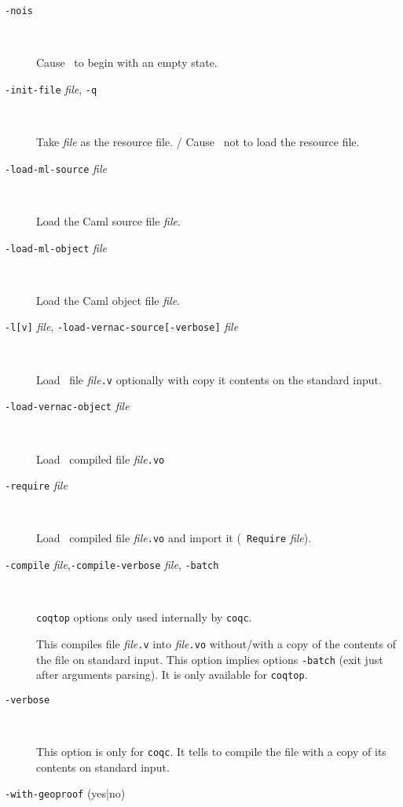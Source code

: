 \begin{description}
\item[{\tt -nois}]\ 

  Cause \Coq~to begin with an empty state.

\item[{\tt -init-file} {\em file}, {\tt -q}]\ 

  Take {\em file} as the resource file. /
  Cause \Coq~not to load the resource file.

\item[{\tt -load-ml-source} {\em file}]\ 

  Load the Caml source file {\em file}.

\item[{\tt -load-ml-object} {\em file}]\ 

  Load the Caml object file {\em file}.

\item[{\tt -l[v]} {\em file}, {\tt -load-vernac-source[-verbose]} {\em file}]\ 

  Load \Coq~file {\em file}{\tt .v} optionally with copy it contents on the
  standard input.

\item[{\tt -load-vernac-object} {\em file}]\ 

  Load \Coq~compiled file {\em file}{\tt .vo}

\item[{\tt -require} {\em file}]\ 

  Load \Coq~compiled file {\em file}{\tt .vo} and import it ({\tt
    Require} {\em file}).

\item[{\tt -compile} {\em file},{\tt -compile-verbose} {\em file}, {\tt -batch}]\ 

  {\tt coqtop} options only used internally by {\tt coqc}.

  This compiles file {\em file}{\tt .v} into {\em file}{\tt .vo} without/with a
  copy of the contents of the file on standard input.  This option implies options
  {\tt -batch} (exit just after arguments parsing). It is only
  available for {\tt coqtop}.

\item[{\tt -verbose}]\ 

  This option is only for {\tt coqc}. It tells to compile the file with
  a copy of its contents on standard input.

%

\item[{\tt -with-geoproof} (yes|no)]\ 


\end{description}
